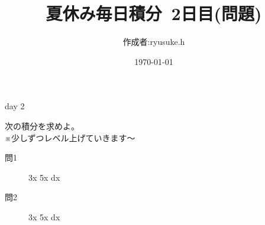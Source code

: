 \documentclass[12pt,a4paper]{jsarticle}
\title{夏休み毎日積分~2日目(問題)}
\date{\today}
\begin{document}
\maketitle
\begin{flushright}
    \author{作成者:ryusuke.h}
\end{flushright}
\begin{itembox}[c]{day 2 }
    \begin{center}
        次の積分を求めよ。\\
        ※少しずつレベル上げていきます〜
    \end{center}
\end{itembox}
\begin{description}
    \item [問1] \int \sin3x \cos5x dx
\end{description}
\begin{description}
    \item [問2] \int \cos3x \cos5x dx
\end{description}
\end{document}
